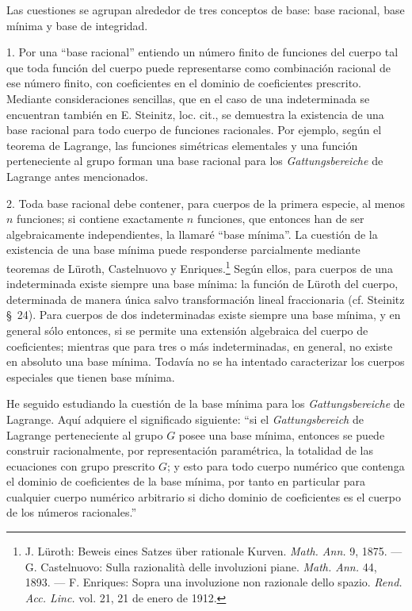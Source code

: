 \documentclass[11pt]{article}
\begin{document}
Las cuestiones se agrupan alrededor de tres conceptos de base: base racional, base mínima y base de integridad.

1. Por una ``base racional'' entiendo un número finito de funciones del cuerpo tal que toda función del cuerpo puede representarse como combinación racional de ese número finito, con coeficientes en el dominio de coeficientes prescrito. Mediante consideraciones sencillas, que en el caso de una indeterminada se encuentran también en E. Steinitz, loc. cit., se demuestra la existencia de una base racional para todo cuerpo de funciones racionales. Por ejemplo, según el teorema de Lagrange, las funciones simétricas elementales y una función perteneciente al grupo forman una base racional para los \emph{Gattungsbereiche} de Lagrange antes mencionados.

2. Toda base racional debe contener, para cuerpos de la primera especie, al menos $n$ funciones; si contiene exactamente $n$ funciones, que entonces han de ser algebraicamente independientes, la llamaré ``base mínima''. La cuestión de la existencia de una base mínima puede responderse parcialmente mediante teoremas de Lüroth, Castelnuovo y Enriques.\footnote{J. Lüroth: Beweis eines Satzes über rationale Kurven. \emph{Math. Ann.} 9, 1875. --- G. Castelnuovo: Sulla razionalità delle involuzioni piane. \emph{Math. Ann.} 44, 1893. --- F. Enriques: Sopra una involuzione non razionale dello spazio. \emph{Rend. Acc. Linc.} vol. 21, 21 de enero de 1912.} Según ellos, para cuerpos de una indeterminada existe siempre una base mínima: la función de Lüroth del cuerpo, determinada de manera única salvo transformación lineal fraccionaria (cf. Steinitz \S\ 24). Para cuerpos de dos indeterminadas existe siempre una base mínima, y en general sólo entonces, si se permite una extensión algebraica del cuerpo de coeficientes; mientras que para tres o más indeterminadas, en general, no existe en absoluto una base mínima. Todavía no se ha intentado caracterizar los cuerpos especiales que tienen base mínima.

He seguido estudiando la cuestión de la base mínima para los \emph{Gattungsbereiche} de Lagrange. Aquí adquiere el significado siguiente: ``si el \emph{Gattungsbereich} de Lagrange perteneciente al grupo $G$ posee una base mínima, entonces se puede construir racionalmente, por representación paramétrica, la totalidad de las ecuaciones con grupo prescrito $G$; y esto para todo cuerpo numérico que contenga el dominio de coeficientes de la base mínima, por tanto en particular para cualquier cuerpo numérico arbitrario si dicho dominio de coeficientes es el cuerpo de los números racionales.''
\end{document}
